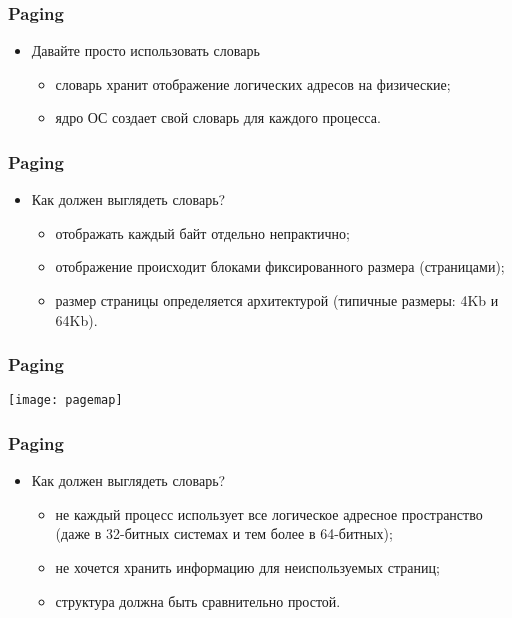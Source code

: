 \begin{frame}
\frametitle{Paging}
\begin{itemize}
    \item<1->Давайте просто использовать словарь
    \begin{itemize}
        \item<1->словарь хранит отображение логических адресов на физические;
        \item<2->ядро ОС создает свой словарь для каждого процесса.
    \end{itemize}
\end{itemize}
\end{frame}

\begin{frame}
\frametitle{Paging}
\begin{itemize}
    \item<1->Как должен выглядеть словарь?
    \begin{itemize}
        \item<2->отображать каждый байт отдельно непрактично;
        \item<3->отображение происходит блоками фиксированного размера
        (страницами);
        \item<4->размер страницы определяется архитектурой (типичные размеры:
        4Kb и 64Kb).
    \end{itemize}
\end{itemize}
\end{frame}

\begin{frame}
\frametitle{Paging}
\texttt{[image: pagemap]}
\end{frame}

\begin{frame}
\frametitle{Paging}
\begin{itemize}
    \item<1->Как должен выглядеть словарь?
    \begin{itemize}
        \item<2->не каждый процесс использует все логическое адресное
        пространство (даже в 32-битных системах и тем более в 64-битных);
        \item<3->не хочется хранить информацию для неиспользуемых страниц;
        \item<4->структура должна быть сравнительно простой.
    \end{itemize}
\end{itemize}
\end{frame}

